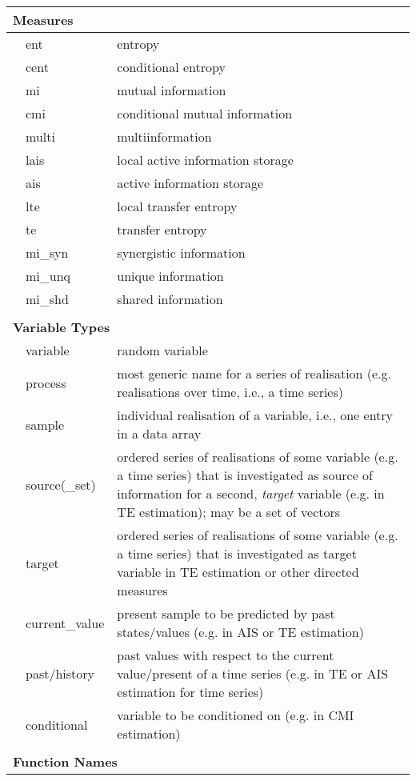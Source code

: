 \documentclass[%
10pt,								%
]
{scrartcl}
\begin{document}
\begin{longtable}{p{0.1em}lp{9cm}}
 \multicolumn{3}{l}{\textbf{Measures}} \\ \hline
 & ent & entropy \\
 & cent & conditional entropy \\
 & mi & mutual information \\
 & cmi & conditional mutual information \\
 & multi & multiinformation \\
 & lais & local active information storage \\
 & ais & active information storage \\
 & lte & local transfer entropy \\
 & te & transfer entropy \\
 & mi\_syn & synergistic information\\
 & mi\_unq & unique information\\
 & mi\_shd & shared information\\ 
 &&\\
 \multicolumn{3}{l}{\textbf{Variable Types}} \\ \hline
 & variable & random variable\\
 & process & most generic name for a series of realisation (e.g. realisations over time, i.e., a time series) \\
 & sample & individual realisation of a variable, i.e., one entry in a data array \\
 & source(\_set) & ordered series of realisations of some variable (e.g. a time series) that is investigated as source of information for a second, \textit{target} variable (e.g. in TE estimation); may be a set of vectors \\
 & target & ordered series of realisations of some variable (e.g. a time series) that is investigated as target variable in TE estimation or other directed measures \\
 & current\_value & present sample to be predicted by past states/values (e.g. in AIS or TE estimation) \\ 
 & past/history & past values with respect to the current value/present of a time series (e.g. in TE or AIS estimation for time series) \\
 & conditional & variable to be conditioned on (e.g. in CMI estimation) \\
 &&\\
 \multicolumn{3}{l}{\textbf{Function Names}} \\ \hline 

\end{longtable}
\end{document}
